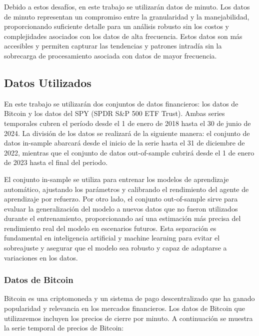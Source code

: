 \documentclass[a4paper,12pt, twoside]{report}
\begin{document}
Debido a estos desafíos, en este trabajo se utilizarán datos de minuto. Los datos de minuto representan un compromiso entre la 
granularidad y la manejabilidad, proporcionando suficiente detalle para un análisis robusto sin los costos y complejidades asociados 
con los datos de alta frecuencia. Estos datos son más accesibles y permiten capturar las tendencias y patrones intradía sin la 
sobrecarga de procesamiento asociada con datos de mayor frecuencia.



\subsection{Datos Utilizados}

En este trabajo se utilizarán dos conjuntos de datos financieros: los datos de Bitcoin y los 
datos del SPY (SPDR S\&P 500 ETF Trust). Ambas series temporales cubren el período desde el 
1 de enero de 2018 hasta el 30 de junio de 2024. La división de los datos se realizará de la 
siguiente manera: el conjunto de datos in-sample abarcará desde el inicio de la serie hasta 
el 31 de diciembre de 2022, mientras que el conjunto de datos out-of-sample cubrirá desde el 
1 de enero de 2023 hasta el final del periodo.

El conjunto in-sample se utiliza para entrenar los modelos de aprendizaje automático, 
ajustando los parámetros y calibrando el rendimiento del agente de aprendizaje por refuerzo. 
Por otro lado, el conjunto out-of-sample sirve para evaluar la generalización del modelo a 
nuevos datos que no fueron utilizados durante el entrenamiento, proporcionando así una 
estimación más precisa del rendimiento real del modelo en escenarios futuros. Esta separación 
es fundamental en inteligencia artificial y machine learning para evitar el sobreajuste y 
asegurar que el modelo sea robusto y capaz de adaptarse a variaciones en los datos.



\subsubsection{Datos de Bitcoin}

Bitcoin es una criptomoneda y un sistema de pago descentralizado que ha ganado popularidad y relevancia en los mercados financieros. 
Los datos de Bitcoin que utilizaremos incluyen los precios de cierre por minuto. A continuación se muestra la serie temporal de precios 
de Bitcoin:
\end{document}

